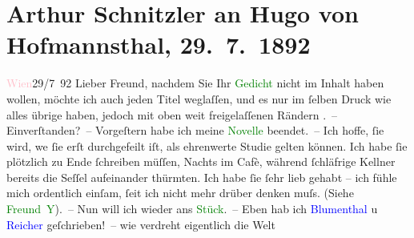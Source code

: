 

               \section[Arthur Schnitzler an Hugo von Hofmannsthal, 29. 7. 1892]{ Arthur Schnitzler an Hugo von Hofmannsthal, 29. 7. 1892}\nopagebreak{}\rehead{ }\normalsize\beginnumbering{} \toendnotes[C]{\smallbreak\pagebreak[2]} 
\toendnotes[C]{\smallbreak}\pstart
           {\pb}\textcolor{pink}{Wien}{}\ledrightnote{\textcolor{pink}{Wien}}\hfill 29/7 92\pend
           \pstart{}Lieber Freund,\pend\pstart
           nachdem Sie Ihr \textcolor{green}{Gedicht}{} nicht im Inhalt haben
                    wollen, möchte ich auch jeden Titel weglaſſen, und es nur im ſelben Druck wie
                    alles übrige \introOben{}haben\introOben{}, jedoch mit oben weit freigelaſſenen
                    Rändern . – Einverſtanden? –\pend
           \pstart
           Vorgeſtern habe ich meine \textcolor{green}{Novelle}{} beendet. –
                    Ich hoffe, {\pb}ſie wird, we{\geminationn}{ }ſie erſt durchgefeilt iſt, als ehrenwerte Studie
                    gelten können. Ich habe ſie plötzlich zu Ende ſchreiben müſſen, Nachts im Cafè,
                    während ſchläfrige Kellner bereits die Seſſel aufeinander thürmten. Ich habe ſie
                    ſehr lieb gehabt – ich fühle mich ordentlich einſam, ſeit ich nicht mehr drüber
                    denken muſs. {\pb}(Siehe \textcolor{green}{Freund \textsc{Y}}{}\ledrightnote{\textcolor{green}{Mein Freund Ypsilon}}). – Nun will ich wieder
                    ans \textcolor{green}{Stück}{}. – Eben hab ich \textcolor{blue}{Blumenthal}{}\ledrightnote{\textcolor{blue}{Oskar Blumenthal}} u \textcolor{blue}{Reicher}{}\ledrightnote{\textcolor{blue}{Emanuel Reicher}} geſchrieben! – wie verdreht eigentlich die Welt

